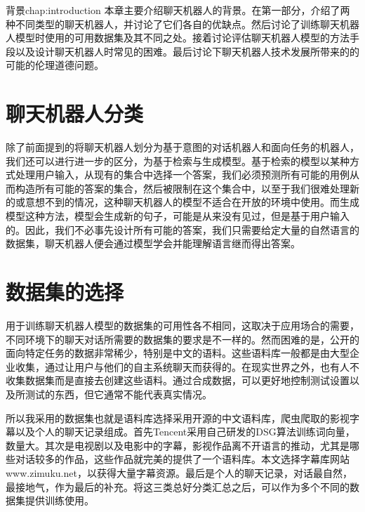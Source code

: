 \begin{cuzchapter}{背景}{chap:introduction}
本章主要介绍聊天机器人的背景。在第一部分，介绍了两种不同类型的聊天机器人，并讨论了它们各自的优缺点。然后讨论了训练聊天机器人模型时使用的可用数据集及其不同之处。接着讨论评估聊天机器人模型的方法手段以及设计聊天机器人时常见的困难。最后讨论下聊天机器人技术发展所带来的的可能的伦理道德问题。
\section{聊天机器人分类}\label{sec:background}
除了前面提到的将聊天机器人划分为基于意图的对话机器人和面向任务的机器人，我们还可以进行进一步的区分，为基于检索\cite{279181}与生成模型\cite{DBLP:journals/corr/ShangLL15}。基于检索的模型以某种方式处理用户输入，从现有的集合中选择一个答案，我们必须预测所有可能的用例从而构造所有可能的答案的集合，然后被限制在这个集合中，以至于我们很难处理新的或意想不到的情况，这种聊天机器人的模型不适合在开放的环境中使用。而生成模型这种方法，模型会生成新的句子，可能是从来没有见过，但是基于用户输入的。因此，我们不必事先设计所有可能的答案，我们只需要给定大量的自然语言的数据集，聊天机器人便会通过模型学会并能理解语言继而得出答案。
\section{数据集的选择}\label{sec:background}
用于训练聊天机器人模型的数据集的可用性各不相同，这取决于应用场合的需要，不同环境下的聊天对话所需要的数据集的要求是不一样的。然而困难的是，公开的面向特定任务的数据非常稀少，特别是中文的语料。这些语料库一般都是由大型企业收集，通过让用户与他们的自主系统聊天而获得的。在现实世界之外，也有人不收集数据集而是直接去创建这些语料。通过合成数据，可以更好地控制测试设置以及所测试的东西，但它通常不能代表真实情况。

所以我采用的数据集也就是语料库选择采用开源的中文语料库，爬虫爬取的影视字幕以及个人的聊天记录组成。首先Tencent采用自己研发的DSG算法训练词向量，数量大。其次是电视剧以及电影中的字幕，影视作品离不开语言的推动，尤其是哪些对话较多的作品，这些作品就完美的提供了一个语料库。本文选择字幕库网站www.zimuku.net，以获得大量字幕资源。最后是个人的聊天记录，对话最自然，最接地气，作为最后的补充。将这三类总好分类汇总之后，可以作为多个不同的数据集提供训练使用。

\end{cuzchapter}
